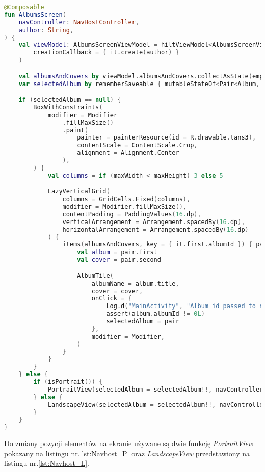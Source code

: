 \begin{lstlisting}[caption=Kod \texttt{Navhost AlbumsScreen}, label={lst:Navhost_AS}, language=kotlin]
@Composable
fun AlbumsScreen(
    navController: NavHostController,
    author: String,
) {
    val viewModel: AlbumsScreenViewModel = hiltViewModel<AlbumsScreenViewModel, AlbumsScreenViewModel.Factory>(
        creationCallback = { it.create(author) }
    )

    val albumsAndCovers by viewModel.albumsAndCovers.collectAsState(emptyList())
    var selectedAlbum by rememberSaveable { mutableStateOf<Pair<Album, ImageBitmap>?>(null) }

    if (selectedAlbum == null) {
        BoxWithConstraints(
            modifier = Modifier
                .fillMaxSize()
                .paint(
                    painter = painterResource(id = R.drawable.tans3),
                    contentScale = ContentScale.Crop,
                    alignment = Alignment.Center
                ),
        ) {
            val columns = if (maxWidth < maxHeight) 3 else 5

            LazyVerticalGrid(
                columns = GridCells.Fixed(columns),
                modifier = Modifier.fillMaxSize(),
                contentPadding = PaddingValues(16.dp),
                verticalArrangement = Arrangement.spacedBy(16.dp),
                horizontalArrangement = Arrangement.spacedBy(16.dp)
            ) {
                items(albumsAndCovers, key = { it.first.albumId }) { pair ->
                    val album = pair.first
                    val cover = pair.second

                    AlbumTile(
                        albumName = album.title,
                        cover = cover,
                        onClick = {
                            Log.d("MainActivity", "Album id passed to navhost: ${album.albumId}")
                            assert(album.albumId != 0L)
                            selectedAlbum = pair
                        },
                        modifier = Modifier,
                    )
                }
            }
        }
    } else {
        if (isPortrait()) {
            PortraitView(selectedAlbum = selectedAlbum!!, navController = navController)
        } else {
            LandscapeView(selectedAlbum = selectedAlbum!!, navController = navController)
        }
    }
}
\end{lstlisting}
Do zmiany pozycji elementów na ekranie używane są dwie funkcję \textit{PortraitView} pokazany na listingu nr.\ref{lst:Navhost_P} oraz \textit{LandscapeView} przedstawiony na listingu nr.\ref{lst:Navhost_L}.
